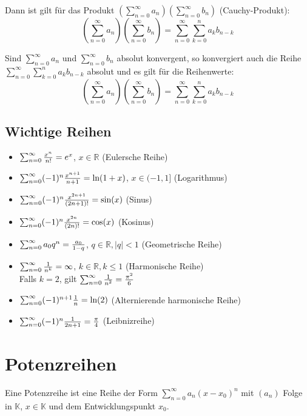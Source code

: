 		Dann ist gilt für das Produkt $ (\sum _ { n = 0 } ^ { \infty } a _ n) (\sum _ { n = 0 } ^ { \infty } b _ n) $ (Cauchy-Produkt):
		\begin{equation*}
			(\sum _ { n = 0 } ^ { \infty } a _ n) (\sum _ { n = 0 } ^ { \infty } b _ n) = \sum _ { n = 0 } ^ \infty \sum _ { k = 0 } ^ n a _ k b _ { n - k }
		\end{equation*}

		Sind $ \sum _ { n = 0 } ^ { \infty } a _ n $ und $ \sum _ { n = 0 } ^ { \infty } b _ n $ absolut konvergent, so konvergiert auch die Reihe $ \sum _ { n = 0 } ^ \infty \sum _ { k = 0 } ^ n a _ k b _ { n - k } $ absolut und es gilt für die Reihenwerte:
		\begin{equation*}
			(\sum _ { n = 0 } ^ { \infty } a _ n) (\sum _ { n = 0 } ^ { \infty } b _ n) = \sum _ { n = 0 } ^ \infty \sum _ { k = 0 } ^ n a _ k b _ { n - k }
		\end{equation*}

	\section{Wichtige Reihen}
		\begin{itemize}
			\item $ \sum_{n = 0}^\infty \frac{x ^ n}{n!} = e ^ x $, $ x \in \mathbb{R} $ (Eulersche Reihe)
			\item $ \sum_{n = 0}^\infty (-1) ^ n \frac{x ^ { n + 1 }}{n + 1} = \text{ln}(1 + x) $, $ x \in (-1, 1] $ (Logarithmus)
			\item $ \sum_{n = 0}^\infty (-1) ^ n \frac{x ^ { 2n + 1 }}{(2n + 1)!} = \text{sin}(x) $ (Sinus)
			\item $ \sum_{n = 0}^\infty (-1) ^ n \frac{x ^ { 2n }}{(2n)!} = \text{cos}(x) $ (Kosinus)
			\item $ \sum_{n = 0}^\infty a _ 0 q ^ n = \frac{a _ 0}{1 - q} $, $ q \in \mathbb{R}, \lvert q \rvert < 1 $ (Geometrische Reihe)
			\item $ \sum_{n = 0}^\infty \frac{1}{n ^ k} = \infty $, $ k \in \mathbb{R}, k \leq 1 $ (Harmonische Reihe) \\ Falls $ k = 2 $, gilt $ \sum_{n = 0}^\infty \frac{1}{n ^ 2} = \frac{\pi ^ 2}{6} $
			\item $ \sum_{n = 0}^\infty (-1) ^ { n + 1 } \frac{1}{n} = \text{ln}(2) $ (Alternierende harmonische Reihe)
			\item $ \sum_{n = 0}^\infty (-1) ^ n \frac{1}{2n + 1} = \frac{\pi}{4} $ (Leibnizreihe)
		\end{itemize}

\chapter{Potenzreihen}
	Eine Potenzreihe ist eine Reihe der Form $ \sum _ { n = 0 } ^ \infty a _ n (x - x _ 0) ^ n $ mit $ (a _ n) $ Folge in $ \mathbb{K} $, $ x \in \mathbb{K} $ und dem Entwicklungspunkt $ x _ 0 $.

